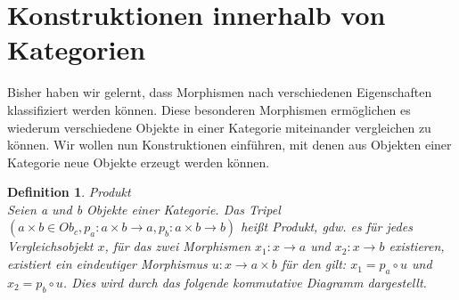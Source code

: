 \documentclass[a4paper]{scrartcl}
\newtheorem{definition}{Definition}
\begin{document}
\section{Konstruktionen innerhalb von Kategorien}
Bisher haben wir gelernt, dass Morphismen nach verschiedenen Eigenschaften klassifiziert werden können. Diese besonderen Morphismen ermöglichen es wiederum verschiedene Objekte in einer Kategorie miteinander vergleichen zu können. Wir wollen nun Konstruktionen einführen, mit denen aus Objekten einer Kategorie neue Objekte erzeugt werden können.
\begin{definition}{Produkt}\\
Seien a und b Objekte einer Kategorie. Das Tripel $(a\times b \in Ob_c, p_a: a\times b \rightarrow a, p_b: a\times b \rightarrow b)$ heißt Produkt, gdw. es für jedes Vergleichsobjekt $x$, für das zwei Morphismen $x_1: x \rightarrow a$ und $x_2: x \rightarrow b$ existieren, existiert ein eindeutiger Morphismus $u: x \rightarrow a\times b$ für den gilt: $x_1 = p_a \circ u$ und $x_2 = p_b \circ u$. Dies wird durch das folgende kommutative Diagramm dargestellt.
\begin{center}
\end{center}
\end{definition}
\end{document}
